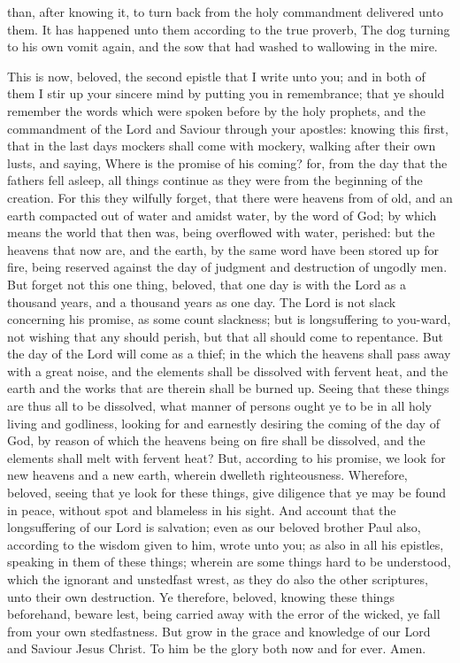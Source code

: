 than, after knowing it, to turn back from the holy commandment delivered unto them. It has happened unto them according to the true proverb, The dog turning to his own vomit again, and the sow that had washed to wallowing in the mire. 

This is now, beloved, the second epistle that I write unto you; and in both of them I stir up your sincere mind by putting you in remembrance; that ye should remember the words which were spoken before by the holy prophets, and the commandment of the Lord and Saviour through your apostles: knowing this first, that in the last days mockers shall come with mockery, walking after their own lusts, and saying, Where is the promise of his coming? for, from the day that the fathers fell asleep, all things continue as they were from the beginning of the creation. For this they wilfully forget, that there were heavens from of old, and an earth compacted out of water and amidst water, by the word of God; by which means the world that then was, being overflowed with water, perished: but the heavens that now are, and the earth, by the same word have been stored up for fire, being reserved against the day of judgment and destruction of ungodly men.  But forget not this one thing, beloved, that one day is with the Lord as a thousand years, and a thousand years as one day. The Lord is not slack concerning his promise, as some count slackness; but is longsuffering to you-ward, not wishing that any should perish, but that all should come to repentance. But the day of the Lord will come as a thief; in the which the heavens shall pass away with a great noise, and the elements shall be dissolved with fervent heat, and the earth and the works that are therein shall be burned up. Seeing that these things are thus all to be dissolved, what manner of persons ought ye to be in all holy living and godliness, looking for and earnestly desiring the coming of the day of God, by reason of which the heavens being on fire shall be dissolved, and the elements shall melt with fervent heat? But, according to his promise, we look for new heavens and a new earth, wherein dwelleth righteousness.  Wherefore, beloved, seeing that ye look for these things, give diligence that ye may be found in peace, without spot and blameless in his sight. And account that the longsuffering of our Lord is salvation; even as our beloved brother Paul also, according to the wisdom given to him, wrote unto you; as also in all his epistles, speaking in them of these things; wherein are some things hard to be understood, which the ignorant and unstedfast wrest, as they do also the other scriptures, unto their own destruction. Ye therefore, beloved, knowing these things beforehand, beware lest, being carried away with the error of the wicked, ye fall from your own stedfastness. But grow in the grace and knowledge of our Lord and Saviour Jesus Christ. To him be the glory both now and for ever. Amen. 